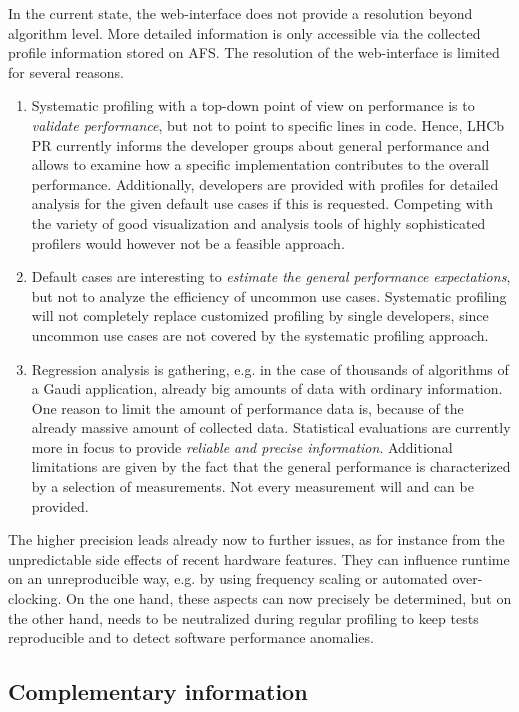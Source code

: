 \documentclass[a4paper]{jpconf}
\begin{document}
In the current state, the web-interface does not provide a resolution beyond algorithm level. More detailed information is only accessible via the collected profile information stored on AFS. The resolution of the web-interface is limited for several reasons.
\begin{enumerate}
 \item Systematic profiling with a top-down point of view on performance is to \textit{validate performance}, but not to point to specific lines in code. Hence, LHCb PR currently informs the developer groups about general performance and allows to examine how a specific implementation contributes to the overall performance. Additionally, developers are provided with profiles for detailed analysis for the given default use cases if this is requested. Competing with the variety of good visualization and analysis tools of highly sophisticated profilers would however not be a feasible approach.
 \item Default cases are interesting to \textit{estimate the general performance expectations}, but not to analyze the efficiency of uncommon use cases. Systematic profiling will not completely replace customized profiling by single developers, since uncommon use cases are not covered by the systematic profiling approach.
 \item Regression analysis is gathering, e.g. in the case of thousands of algorithms of a Gaudi application, already big amounts of data with ordinary information. One reason to limit the amount of performance data is, because of the already massive amount of collected data. Statistical evaluations are currently more in focus to provide \textit{reliable and precise information}. Additional limitations are given by the fact that the general performance is characterized by a selection of measurements. Not every measurement will and can be provided.
\end{enumerate}

The higher precision leads already now to further issues, as for instance from the unpredictable side effects of recent hardware features. They can influence runtime on an unreproducible way, e.g. by using frequency scaling or automated over-clocking. On the one hand, these aspects can now precisely be determined, but on the other hand, needs to be neutralized during regular profiling to keep tests reproducible and to detect software performance anomalies.

\subsection{Complementary information}
\label{sec:complementary_information}
\end{document}
